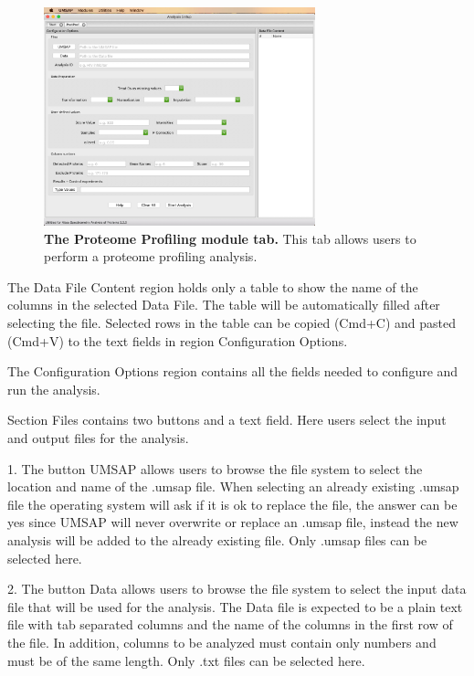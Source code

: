 \begin{figure}[h]
    \centering
    \includegraphics[width=0.7\textwidth]{./IMAGES/MOD-PROTPROF/protprof-mod.jpg}
    \caption[The Proteome Profiling module tab]{\textbf{The Proteome Profiling module
    tab.} This tab allows users to perform a proteome profiling analysis.}
    \label{fig:protprofTab}
    \vspace{-5pt}
\end{figure}

The Data File Content region holds only a table to show the name of the columns in
the selected Data File. The table will be automatically filled after selecting the
file. Selected rows in the table can be copied (Cmd+C) and pasted (Cmd+V) to the
text fields in region Configuration Options.

The Configuration Options region contains all the fields needed to configure and
run the analysis.

Section Files contains two buttons and a text field. Here users select the input
and output files for the analysis.

\num{1}. The button UMSAP allows users to browse the file system to select the location
and name of the .umsap file. When selecting an already existing .umsap file the operating
system will ask if it is ok to replace the file, the answer can be yes since UMSAP
will never overwrite or replace an .umsap file, instead the new analysis will be
added to the already existing file. Only .umsap files can be selected here.

\num{2}. The button Data allows users to browse the file system to select the input
data file that will be used for the analysis. The Data file is expected to be a
plain text file with tab separated columns and the name of the columns in the first
row of the file. In addition, columns to be analyzed must contain only numbers and
must be of the same length. Only .txt files can be selected here.

